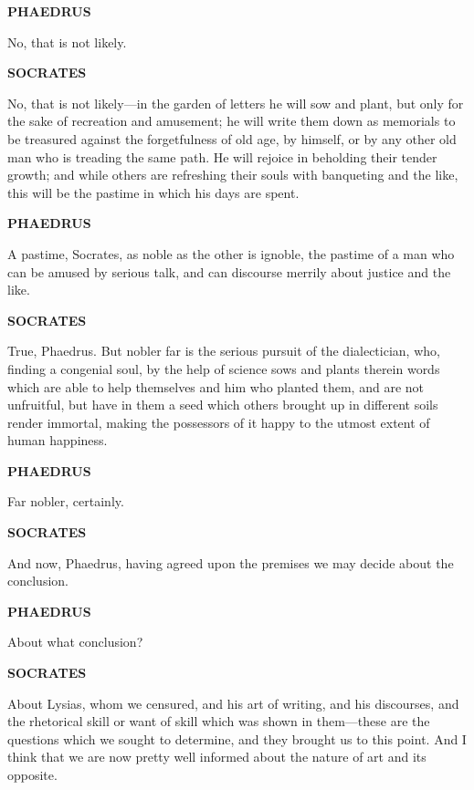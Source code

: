 \documentclass[11pt,letter]{article}
\begin{document}
\par \textbf{PHAEDRUS}
\par   No, that is not likely.

\par \textbf{SOCRATES}
\par   No, that is not likely—in the garden of letters he will sow and plant, but only for the sake of recreation and amusement; he will write them down as memorials to be treasured against the forgetfulness of old age, by himself, or by any other old man who is treading the same path. He will rejoice in beholding their tender growth; and while others are refreshing their souls with banqueting and the like, this will be the pastime in which his days are spent.

\par \textbf{PHAEDRUS}
\par   A pastime, Socrates, as noble as the other is ignoble, the pastime of a man who can be amused by serious talk, and can discourse merrily about justice and the like.

\par \textbf{SOCRATES}
\par   True, Phaedrus. But nobler far is the serious pursuit of the dialectician, who, finding a congenial soul, by the help of science sows and plants therein words which are able to help themselves and him who planted them, and are not unfruitful, but have in them a seed which others brought up in different soils render immortal, making the possessors of it happy to the utmost extent of human happiness.

\par \textbf{PHAEDRUS}
\par   Far nobler, certainly.

\par \textbf{SOCRATES}
\par   And now, Phaedrus, having agreed upon the premises we may decide about the conclusion.

\par \textbf{PHAEDRUS}
\par   About what conclusion?

\par \textbf{SOCRATES}
\par   About Lysias, whom we censured, and his art of writing, and his discourses, and the rhetorical skill or want of skill which was shown in them—these are the questions which we sought to determine, and they brought us to this point. And I think that we are now pretty well informed about the nature of art and its opposite.
\end{document}
